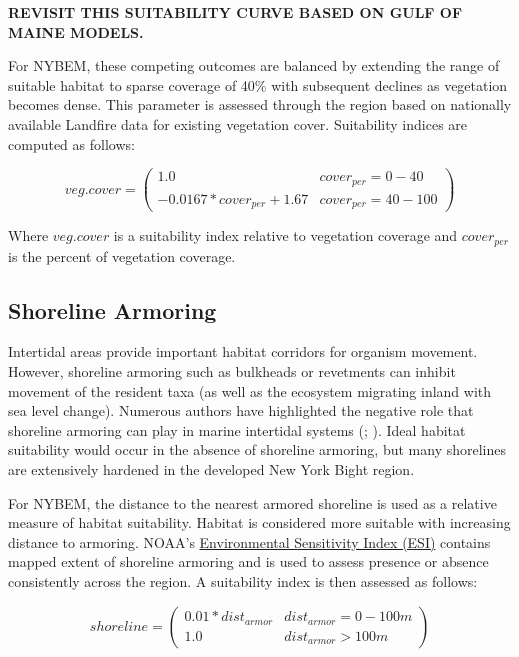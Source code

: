 \documentclass[
]{book}
\begin{document}
\textbf{REVISIT THIS SUITABILITY CURVE BASED ON GULF OF MAINE MODELS.}

For NYBEM, these competing outcomes are balanced by extending the range of suitable habitat to sparse coverage of 40\% with subsequent declines as vegetation becomes dense. This parameter is assessed through the region based on nationally available Landfire data for existing vegetation cover. Suitability indices are computed as follows:

\[veg.cover = \begin{pmatrix} 1.0 & cover_{per}=0-40\\
-0.0167*cover_{per}+1.67 & cover_{per}=40-100
\end{pmatrix}\]

Where \(veg.cover\) is a suitability index relative to vegetation coverage and \(cover_{per}\) is the percent of vegetation coverage.

\hypertarget{shoreline-armoring-1}{%
\subsection{Shoreline Armoring}\label{shoreline-armoring-1}}

Intertidal areas provide important habitat corridors for organism movement. However, shoreline armoring such as bulkheads or revetments can inhibit movement of the resident taxa (as well as the ecosystem migrating inland with sea level change). Numerous authors have highlighted the negative role that shoreline armoring can play in marine intertidal systems (\citet{usace_evaluation_2009}; \citet{lathrope_mapping_2013}). Ideal habitat suitability would occur in the absence of shoreline armoring, but many shorelines are extensively hardened in the developed New York Bight region.

For NYBEM, the distance to the nearest armored shoreline is used as a relative measure of habitat suitability. Habitat is considered more suitable with increasing distance to armoring. NOAA's \href{https://response.restoration.noaa.gov/resources/environmental-sensitivity-index-esi-maps}{Environmental Sensitivity Index (ESI)} contains mapped extent of shoreline armoring and is used to assess presence or absence consistently across the region. A suitability index is then assessed as follows:

\[shoreline = \begin{pmatrix} 0.01*dist_{armor} & dist_{armor}=0-100m\\
1.0 & dist_{armor}>100m
\end{pmatrix}\]
\end{document}
